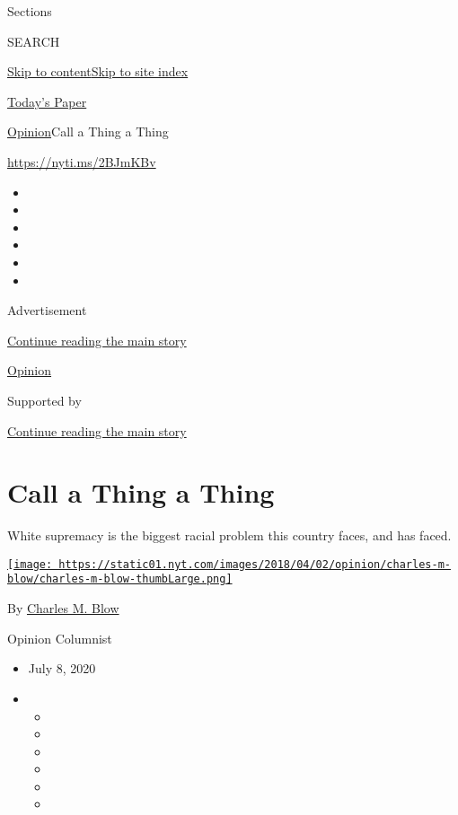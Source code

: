 Sections

SEARCH

\protect\hyperlink{site-content}{Skip to
content}\protect\hyperlink{site-index}{Skip to site index}

\href{https://myaccount.nytimes.com/auth/login?response_type=cookie\&client_id=vi}{}

\href{https://www.nytimes.com/section/todayspaper}{Today's Paper}

\href{/section/opinion}{Opinion}\textbar{}Call a Thing a Thing

\url{https://nyti.ms/2BJmKBv}

\begin{itemize}
\item
\item
\item
\item
\item
\item
\end{itemize}

Advertisement

\protect\hyperlink{after-top}{Continue reading the main story}

\href{/section/opinion}{Opinion}

Supported by

\protect\hyperlink{after-sponsor}{Continue reading the main story}

\hypertarget{call-a-thing-a-thing}{%
\section{Call a Thing a Thing}\label{call-a-thing-a-thing}}

White supremacy is the biggest racial problem this country faces, and
has faced.

\href{https://www.nytimes.com/by/charles-m-blow}{\texttt{[image: https://static01.nyt.com/images/2018/04/02/opinion/charles-m-blow/charles-m-blow-thumbLarge.png]}}

By \href{https://www.nytimes.com/by/charles-m-blow}{Charles M. Blow}

Opinion Columnist

\begin{itemize}
\item
  July 8, 2020
\item
  \begin{itemize}
  \item
  \item
  \item
  \item
  \item
  \item
  \end{itemize}
\end{itemize}

